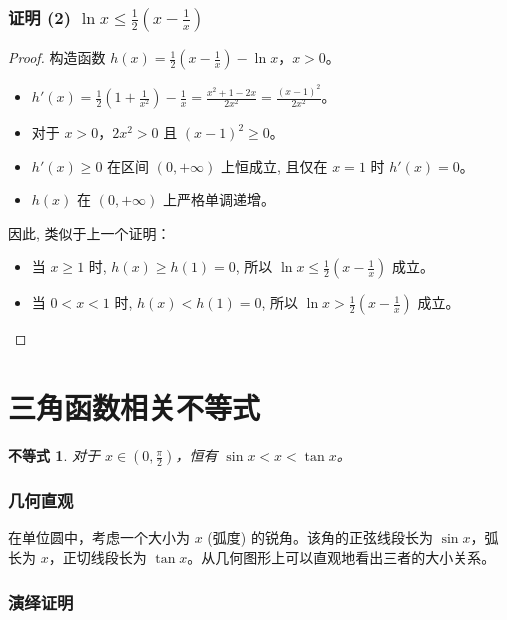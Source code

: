 \documentclass[a4paper,12pt]{ctexart}
\theoremstyle{mytheoremstyle}
\newtheorem{theorem}{不等式}
\begin{document}
\subsubsection*{\textcolor{MyGreen}{证明 (2) $\ln x \le \frac{1}{2}(x-\frac{1}{x})$}}
\begin{proof}
构造函数 $h(x) = \frac{1}{2}(x-\frac{1}{x}) - \ln x$，$x > 0$。
\begin{itemize}
    \item[∵] $h'(x) = \frac{1}{2}(1+\frac{1}{x^2}) - \frac{1}{x} = \frac{x^2+1-2x}{2x^2} = \frac{(x-1)^2}{2x^2}$。
    \item[∵] 对于 $x > 0$，$2x^2>0$ 且 $(x-1)^2 \ge 0$。
    \item[∴] $h'(x) \ge 0$ 在区间 $(0, +\infty)$ 上恒成立, 且仅在 $x=1$ 时 $h'(x)=0$。
    \item[∴] $h(x)$ 在 $(0, +\infty)$ 上严格单调递增。
\end{itemize}
因此, 类似于上一个证明：
\begin{itemize}
    \item 当 $x \ge 1$ 时, $h(x) \ge h(1) = 0$, 所以 $\ln x \le \frac{1}{2}(x-\frac{1}{x})$ 成立。
    \item 当 $0< x < 1$ 时, $h(x) < h(1) = 0$, 所以 $\ln x > \frac{1}{2}(x-\frac{1}{x})$ 成立。
\end{itemize}
\end{proof}

\newpage
\section{\textcolor{MyBlue}{三角函数相关不等式}}

\begin{theorem}
对于 $x \in (0, \frac{\pi}{2})$，恒有 $\sin x < x < \tan x$。
\end{theorem}

\subsubsection*{\textcolor{MyGreen}{几何直观}}
在单位圆中，考虑一个大小为 $x$ (弧度) 的锐角。该角的正弦线段长为 $\sin x$，弧长为 $x$，正切线段长为 $\tan x$。从几何图形上可以直观地看出三者的大小关系。

\subsubsection*{\textcolor{MyGreen}{演绎证明}}
\end{document}
